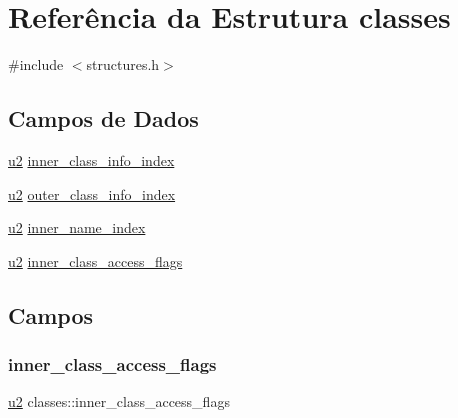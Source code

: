 \hypertarget{structclasses}{}\section{Referência da Estrutura classes}
\label{structclasses}


{\ttfamily \#include $<$structures.\+h$>$}

\subsection*{Campos de Dados}
\begin{DoxyCompactItemize}
\item 
\hyperlink{lista__operandos_8h_a732cde1300aafb73b0ea6c2558a7a54f}{u2} \hyperlink{structclasses_a0b0500d3d12c2572e38ec03f4eb018cd}{inner\+\_\+class\+\_\+info\+\_\+index}
\item 
\hyperlink{lista__operandos_8h_a732cde1300aafb73b0ea6c2558a7a54f}{u2} \hyperlink{structclasses_a0f25ecea2b18dfbcf23e4a6975eb1f21}{outer\+\_\+class\+\_\+info\+\_\+index}
\item 
\hyperlink{lista__operandos_8h_a732cde1300aafb73b0ea6c2558a7a54f}{u2} \hyperlink{structclasses_a8cdb61a61adc9fc0d99acc9be0915187}{inner\+\_\+name\+\_\+index}
\item 
\hyperlink{lista__operandos_8h_a732cde1300aafb73b0ea6c2558a7a54f}{u2} \hyperlink{structclasses_a493162e441680c04b835a3b31a371e5c}{inner\+\_\+class\+\_\+access\+\_\+flags}
\end{DoxyCompactItemize}


\subsection{Campos}
\mbox{\label{structclasses_a493162e441680c04b835a3b31a371e5c}} 
\subsubsection{\texorpdfstring{inner\+\_\+class\+\_\+access\+\_\+flags}{inner\_class\_access\_flags}}
{\footnotesize\ttfamily \hyperlink{lista__operandos_8h_a732cde1300aafb73b0ea6c2558a7a54f}{u2} classes\+::inner\+\_\+class\+\_\+access\+\_\+flags}

\mbox{\label{structclasses_a0b0500d3d12c2572e38ec03f4eb018cd}} 
